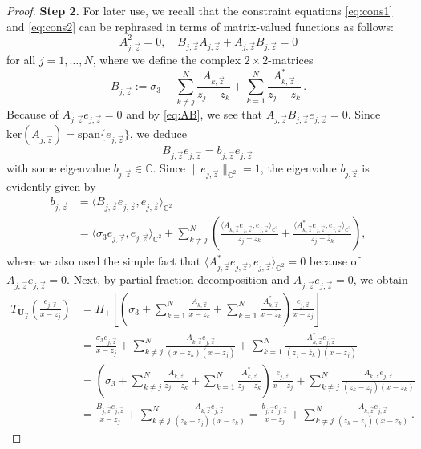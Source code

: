 \documentclass[11pt,reqno]{amsart}
\theoremstyle{definition}
\theoremstyle{remark}
\theoremstyle{remark}
\numberwithin{equation}{section}
\newcommand{\C}{\mathbb{C}}
\newcommand{\ov}{\overline}
\renewcommand{\ker}{\mathrm{ker}}
\newcommand{\be}{\begin{equation}}
\newcommand{\ee}{\end{equation}}
\newcommand{\Ub}{\mathbf{U}}
\begin{document}
\begin{appendix}
\begin{proof}
\medskip
\textbf{Step 2.}
For later use, we recall that the constraint equations \eqref{eq:cons1} and \eqref{eq:cons2} can be rephrased in terms of matrix-valued functions as follows:
\be \label{eq:AB}
A_{j,{\vec{z}}}^2 = 0, \quad B_{j,\vec{z}} A_{j,\vec{z}} + A_{j,\vec{z}} B_{j,\vec{z}}= 0
\ee
for all $j=1, \ldots, N$, where we define the complex $2 \times 2$-matrices
\be \label{eq:AB2}
B_{j,\vec{z}} := \sigma_3  + \sum_{k\neq j}^N \frac{A_{k,\vec{z}}}{z_j - z_k} + \sum_{k =1}^N \frac{A_{k,\vec{z}}^*}{z_j - \ov{z}_k} \, .
\ee
Because of $A_{j,\vec{z}} e_{j,\vec{z}}=0$ and by \eqref{eq:AB}, we see that $A_{j,\vec{z}} B_{j,\vec{z}} e_{j,\vec{z}}=0$. Since $\ker(A_{j,\vec{z}}) = \mathrm{span} \{ e_{j,\vec{z}} \}$, we deduce  
$$
B_{j,\vec{z}} e_{j,\vec{z}} = b_{j,\vec{z}} e_{j,\vec{z}} \, 
$$
with some eigenvalue $b_{j,\vec{z}} \in \C$. Since $\| e_{j,\vec{z}} \|_{\C^2}=1$, the eigenvalue $b_{j,\vec{z}}$ is evidently given by
\begin{align}
b_{j,\vec{z}} & = \langle B_{j,\vec{z}} e_{j,\vec{z}}, e_{j,\vec{z}} \rangle_{\C^2}  \nonumber \\ \label{eq:bj} 
& = \langle \sigma_3 e_{j,\vec{z}}, e_{j,\vec{z}} \rangle_{\C^2} + \sum_{k \neq j}^N \left ( \frac{\langle A_{k,\vec{z}} e_{j,\vec{z}}, e_{j,\vec{z}} \rangle_{\C^2}}{z_j - z_k} + \frac{\langle A_{k,\vec{z}}^* e_{j,\vec{z}}, e_{j,\vec{z}} \rangle_{\C^2}}{z_j - \ov{z}_k} \right ) , 
\end{align}
where we also used the simple fact that $\langle A_{j,\vec{z}}^* e_{j,\vec{z}}, e_{j,\vec{z}}  \rangle_{\C^2} =0$ because of $A_{j,\vec{z}} e_{j,\vec{z}} =0$. Next, by partial fraction decomposition and $A_{j,\vec{z}} e_{j,\vec{z}} = 0$, we obtain
\begin{align*}
T_{\Ub_{\vec{z}}} \left ( \frac{e_{j, \vec{z}}}{x-z_j} \right ) & = \Pi_+ \left [ \left ( \sigma_3 + \sum_{k=1}^N \frac{A_{k, \vec{z}}}{x-z_k} + \sum_{k=1}^N \frac{A_{k,\vec{z}}^*}{x-\ov{z}_k} \right ) \frac{e_{j,\vec{z}}}{x-z_j}  \right ]\\
&= \frac{\sigma_3 e_{j,\vec{z}}}{x-z_j} + \sum_{k \neq j}^N \frac{A_{k,\vec{z}} e_{j,\vec{z}}}{(x-z_k)(x-z_j)} + \sum_{k=1}^N \frac{A_{k,\vec{z}}^* e_{j,\vec{z}}}{(z_j-\ov{z}_k) (x-z_j)}  \\
& = \left ( \sigma_3 + \sum_{k \neq j}^N \frac{A_{k,\vec{z}}}{z_j - z_k} + \sum_{k=1}^N \frac{A_{k,\vec{z}}^*}{z_j - \ov{z}_k} \right ) \frac{e_{j,\vec{z}}}{x-z_j} +\sum_{k \neq j}^N \frac{A_{k,\vec{z}} e_{j,\vec{z}}}{(z_k -z_j)(x-z_k)} \\
& = \frac{B_{j,\vec{z}} e_{j,\vec{z}}}{x-z_j} + \sum_{k \neq j}^N \frac{A_{k,\vec{z}} e_{j,\vec{z}}}{(z_k-z_j)(x-z_k)}  = \frac{b_{j,\vec{z}} e_{j,\vec{z}}}{x-z_j} + \sum_{k \neq j}^N \frac{A_{k,\vec{z}} e_{j,\vec{z}}}{(z_k-z_j)(x-z_k)} \, .

\end{align*}
\end{proof}
\end{appendix}
\end{document}
